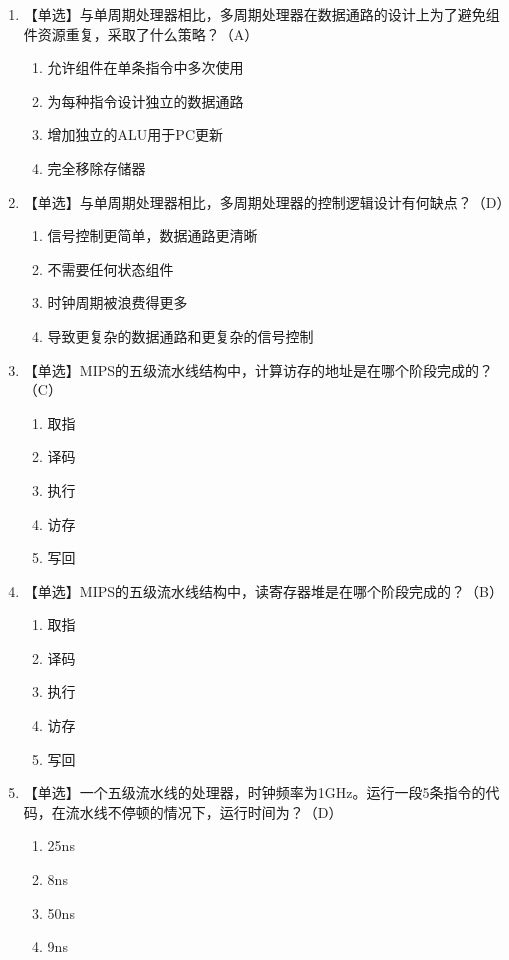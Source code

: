 \documentclass[12pt, a4paper]{article}
\begin{document}
\begin{enumerate}[label=\arabic*.]
    \item 【单选】与单周期处理器相比，多周期处理器在数据通路的设计上为了避免组件资源重复，采取了什么策略？（A）
    \begin{enumerate}[label=\Alph*.]
        \item 允许组件在单条指令中多次使用 \item 为每种指令设计独立的数据通路
        \item 增加独立的ALU用于PC更新 \item 完全移除存储器
    \end{enumerate}

    \item 【单选】与单周期处理器相比，多周期处理器的控制逻辑设计有何缺点？（D）
    \begin{enumerate}[label=\Alph*.]
        \item 信号控制更简单，数据通路更清晰 \item 不需要任何状态组件 \item 时钟周期被浪费得更多 \item 导致更复杂的数据通路和更复杂的信号控制
    \end{enumerate}

    \item 【单选】MIPS的五级流水线结构中，计算访存的地址是在哪个阶段完成的？（C）
    \begin{enumerate}[label=\Alph*.]
        \item 取指 \item 译码 \item 执行 \item 访存 \item 写回
    \end{enumerate}

    \item 【单选】MIPS的五级流水线结构中，读寄存器堆是在哪个阶段完成的？（B）
    \begin{enumerate}[label=\Alph*.]
        \item 取指 \item 译码 \item 执行 \item 访存 \item 写回
    \end{enumerate}

    \item 【单选】一个五级流水线的处理器，时钟频率为1GHz。运行一段5条指令的代码，在流水线不停顿的情况下，运行时间为？（D）
    \begin{enumerate}[label=\Alph*.]
        \item 25ns \item 8ns \item 50ns \item 9ns 
    \end{enumerate}


\end{enumerate}
\end{document}
